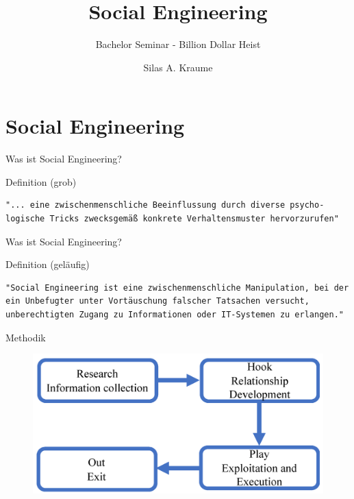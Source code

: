 \documentclass{beamer}
\title{Social Engineering}
\subtitle{Bachelor Seminar - Billion Dollar Heist}
\author{Silas A. Kraume}
\date{}
\begin{document}
\maketitle

\section{Social Engineering}

\begin{frame}[fragile]{Was ist Social Engineering?}
    \begin{block}{Definition (grob)}
        \begin{verbatim}
"... eine zwischenmenschliche Beeinflussung durch diverse psycho-
logische Tricks zwecksgemäß konkrete Verhaltensmuster hervorzurufen"
        \end{verbatim}
    \end{block}
\end{frame}

\begin{frame}[fragile]{Was ist Social Engineering?}
    \begin{block}{Definition (geläufig)}
        \begin{verbatim}
"Social Engineering ist eine zwischenmenschliche Manipulation, bei der 
ein Unbefugter unter Vortäuschung falscher Tatsachen versucht,
unberechtigten Zugang zu Informationen oder IT-Systemen zu erlangen."
        \end{verbatim}
    \end{block}
    \nocite{bka}
\end{frame}

\begin{frame}{Methodik}
    \begin{figure}[!htp]
        \centering
        \includegraphics[scale=.15]{Methodik}
    \end{figure}
    \begin{center}
    \end{center}
    \nocite{methodik}
\end{frame}
\end{document}
